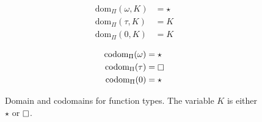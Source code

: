 
\begin{figure}
    \centering
    \begin{minipage}{0.5\textwidth}
        \begin{align*}
            \text{dom}_\Pi(\omega, K) &= \star \\
            \text{dom}_\Pi(\tau, K) &= K \\
            \text{dom}_\Pi(0, K) &= K
        \end{align*}
    \end{minipage}%
    \begin{minipage}{0.5\textwidth}
        \begin{align*}
            \text{codom}_\Pi(\omega) &= \star \\
            \text{codom}_\Pi(\tau) &= \kind \\
            \text{codom}_\Pi(0) &= \star
        \end{align*}
    \end{minipage}
    \caption{Domain and codomains for function types. The variable $K$ is either $\star$ or $\kind$.}
\end{figure}
